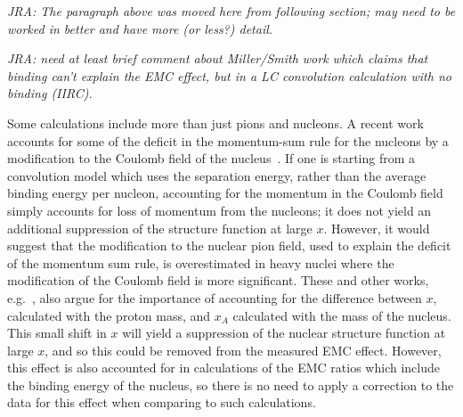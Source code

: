 \textit{JRA: The paragraph above was moved here from following section; may
need to be worked in better and have more (or less?) detail.}

\textit{JRA: need at least brief comment about Miller/Smith work which
claims that binding can't explain the EMC effect, but in a LC convolution
calculation with no binding (IIRC).}


Some calculations include more than just pions and nucleons.  A recent work
accounts for some of the deficit in the momentum-sum rule for the nucleons by
a modification to the Coulomb field of the
nucleus~\cite{Frankfurt_photon_pdf2010, Frankfurt:2012qs}.  If one is starting
from a convolution model which uses the separation energy, rather than the
average binding energy per nucleon, accounting for the momentum in the Coulomb
field simply accounts for loss of momentum from the nucleons; it does not
yield an additional suppression of the structure function at large $x$.
However, it would suggest that the modification to the nuclear pion field,
used to explain the deficit of the momentum sum rule, is overestimated in
heavy nuclei where the modification of the Coulomb field is more significant.
These and other works, e.g.~\cite{hen13}, also argue for the importance of
accounting for the difference between $x$, calculated with the proton mass,
and $x_A$ calculated with the mass of the nucleus.  This small shift in $x$
will yield a suppression of the nuclear structure function at large $x$, and
so this could be removed from the measured EMC effect. However, this effect is
also accounted for in calculations of the EMC ratios which include the binding
energy of the nucleus, so there is no need to apply a correction to the data
for this effect when comparing to such calculations.


